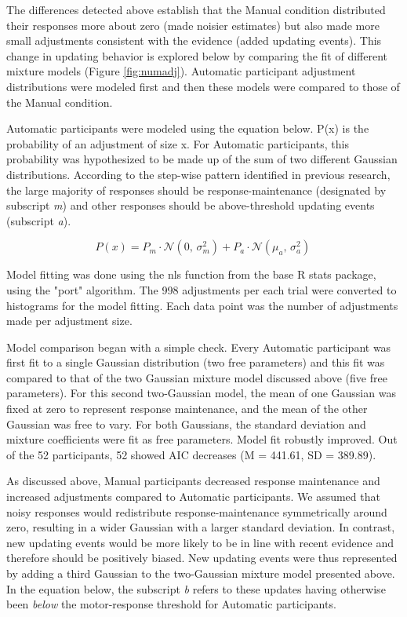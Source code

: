 \documentclass[sn-apa]{sn-jnl}\usepackage[]{graphicx}\usepackage[]{xcolor}
\begin{document}
The differences detected above establish that the Manual condition distributed their responses more about zero (made noisier estimates) but also made more small adjustments consistent with the evidence (added updating events). This change in updating behavior is explored below by comparing the fit of different mixture models (Figure \ref{fig:numadj}). Automatic participant adjustment distributions were modeled first and then these models were compared to those of the Manual condition. 

Automatic participants were modeled using the equation below. P(x) is the probability of an adjustment of size x. For Automatic participants, this probability was hypothesized to be made up of the sum of two different Gaussian distributions. According to the step-wise pattern identified in previous research, the large majority of responses should be response-maintenance (designated by subscript \emph{m}) and other responses should be above-threshold updating events (subscript \emph{a}). 

\begin{equation}
  P(x) = P_m \cdot \mathcal{N}(0,\,\sigma_{m}^{2}) + P_a \cdot \mathcal{N}(\mu_{a},\,\sigma_{a}^{2})\,
\end{equation}

Model fitting was done using the nls function from the base R stats package, using the "port" algorithm. The 998 adjustments per each trial were converted to histograms for the model fitting. Each data point was the number of adjustments made per adjustment size.

Model comparison began with a simple check. Every Automatic participant was first fit to a single Gaussian distribution (two free parameters) and this fit was compared to that of the two Gaussian mixture model discussed above (five free parameters). For this second two-Gaussian model, the mean of one Gaussian was fixed at zero to represent response maintenance, and the mean of the other Gaussian was free to vary. For both Gaussians, the standard deviation and mixture coefficients were fit as free parameters. Model fit robustly improved. Out of the 52 participants, 52 showed AIC decreases (M = 441.61, SD = 389.89).

As discussed above, Manual participants decreased response maintenance and increased adjustments compared to Automatic participants. We assumed that noisy responses would redistribute response-maintenance symmetrically around zero, resulting in a wider Gaussian with a larger standard deviation. In contrast, new updating events would be more likely to be in line with recent evidence and therefore should be positively biased. New updating events were thus represented by adding a third Gaussian to the two-Gaussian mixture model presented above. In the equation below, the subscript \emph{b} refers to these updates having otherwise been \emph{below} the motor-response threshold for Automatic participants.
\end{document}
